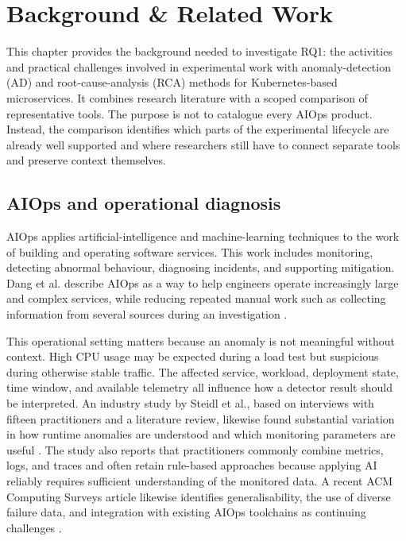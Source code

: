 \chapter{Background \& Related Work}%
\label{ch:background}

This chapter provides the background needed to investigate RQ1: the activities and practical challenges involved in experimental work with anomaly-detection (AD) and root-cause-analysis (RCA) methods for Kubernetes-based microservices. It combines research literature with a scoped comparison of representative tools. The purpose is not to catalogue every AIOps product. Instead, the comparison identifies which parts of the experimental lifecycle are already well supported and where researchers still have to connect separate tools and preserve context themselves.

\section{AIOps and operational diagnosis}

AIOps applies artificial-intelligence and machine-learning techniques to the work of building and operating software services. This work includes monitoring, detecting abnormal behaviour, diagnosing incidents, and supporting mitigation. Dang et al. describe AIOps as a way to help engineers operate increasingly large and complex services, while reducing repeated manual work such as collecting information from several sources during an investigation \parencite{dang2019aiops}.

This operational setting matters because an anomaly is not meaningful without context. High CPU usage may be expected during a load test but suspicious during otherwise stable traffic. The affected service, workload, deployment state, time window, and available telemetry all influence how a detector result should be interpreted. An industry study by Steidl et al., based on interviews with fifteen practitioners and a literature review, likewise found substantial variation in how runtime anomalies are understood and which monitoring parameters are useful \parencite{steidl2024industry}. The study also reports that practitioners commonly combine metrics, logs, and traces and often retain rule-based approaches because applying AI reliably requires sufficient understanding of the monitored data. A recent ACM Computing Surveys article likewise identifies generalisability, the use of diverse failure data, and integration with existing AIOps toolchains as continuing challenges \parencite{zhang2026aiopsllm}.

